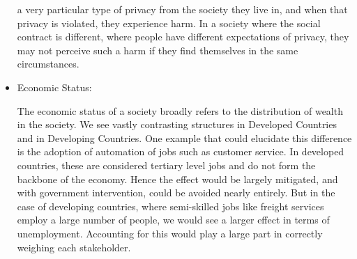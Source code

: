 \begin{itemize}
\begin{pointenv}
      a very particular type of privacy from the society they live in, and 
      when that privacy is violated, they experience harm.  In a society 
      where the social contract is different, where people have different
      expectations of privacy, they may not perceive such a harm if they 
      find themselves in the same circumstances.
    \end{pointenv}
  \item Economic Status:
    \begin{pointenv}
      The economic status of a society broadly refers to the distribution 
      of wealth in the society. We see vastly contrasting structures in 
      Developed Countries and in Developing Countries. One example that 
      could elucidate this difference is the adoption of automation of 
      jobs such as customer service.  In developed countries, these are 
      considered tertiary level jobs and do not form the backbone of the 
      economy. Hence the effect would be largely mitigated, and with 
      government intervention, could be avoided nearly entirely. But in 
      the case of developing countries, where semi-skilled jobs like 
      freight services employ a large number of people, we would see a 
      larger effect in terms of unemployment. Accounting for this would 
      play a large part in correctly weighing each stakeholder.
    \end{pointenv}
\end{itemize}

